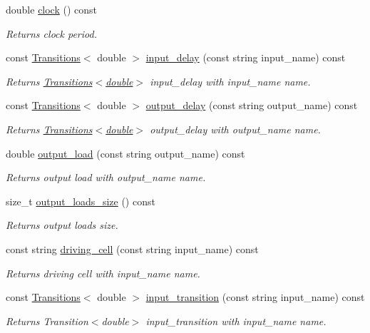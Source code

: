\begin{DoxyCompactItemize}
double \hyperlink{classDesign__Constraints_a535cc6d955b52c959b566510c1e3544a}{clock} () const 
\begin{DoxyCompactList}\small\item\em Returns clock period. \end{DoxyCompactList}\item 
const \hyperlink{classTransitions}{Transitions}$<$ double $>$ \hyperlink{classDesign__Constraints_ae67988a0cd0ba0ab5ad1463c273eb287}{input\-\_\-delay} (const string input\-\_\-name) const 
\begin{DoxyCompactList}\small\item\em Returns \hyperlink{classTransitions}{Transitions$<$double$>$} input\-\_\-delay with input\-\_\-name name. \end{DoxyCompactList}\item 
const \hyperlink{classTransitions}{Transitions}$<$ double $>$ \hyperlink{classDesign__Constraints_a07810050c6ae8a62d1e77ee23ad1f660}{output\-\_\-delay} (const string output\-\_\-name) const 
\begin{DoxyCompactList}\small\item\em Returns \hyperlink{classTransitions}{Transitions$<$double$>$} output\-\_\-delay with output\-\_\-name name. \end{DoxyCompactList}\item 
double \hyperlink{classDesign__Constraints_ab21387336a70852447a1d16e11358840}{output\-\_\-load} (const string output\-\_\-name) const 
\begin{DoxyCompactList}\small\item\em Returns output load with output\-\_\-name name. \end{DoxyCompactList}\item 
size\-\_\-t \hyperlink{classDesign__Constraints_a840bdfc3346651f9925ef35590f8c55b}{output\-\_\-loads\-\_\-size} () const 
\begin{DoxyCompactList}\small\item\em Returns output loads size. \end{DoxyCompactList}\item 
const string \hyperlink{classDesign__Constraints_a3155a41841b4c24e3f79e6e1a280d6df}{driving\-\_\-cell} (const string input\-\_\-name) const 
\begin{DoxyCompactList}\small\item\em Returns driving cell with input\-\_\-name name. \end{DoxyCompactList}\item 
const \hyperlink{classTransitions}{Transitions}$<$ double $>$ \hyperlink{classDesign__Constraints_a2fedb3b4d77d0b029e00bf0200fb84a2}{input\-\_\-transition} (const string input\-\_\-name) const 
\begin{DoxyCompactList}\small\item\em Returns Transition$<$double$>$ input\-\_\-transition with input\-\_\-name name. \end{DoxyCompactList}\end{DoxyCompactItemize}


